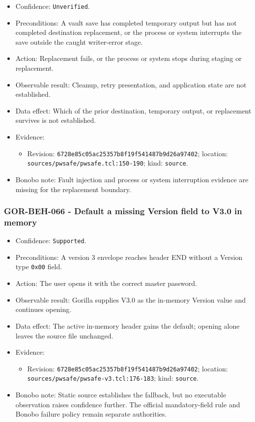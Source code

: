 \documentclass[
  letterpaper,
]{article}
\newcommand{\passthrough}[1]{#1}
\providecommand{\tightlist}{%
  \setlength{\itemsep}{0pt}\setlength{\parskip}{0pt}}
\begin{document}
\begin{itemize}
\tightlist
\item
  Confidence: \nolinkurl{Unverified}.
\item
  Preconditions: A vault save has completed temporary output but has not completed destination replacement, or the
  process or system interrupts the save outside the caught writer-error stage.
\item
  Action: Replacement fails, or the process or system stops during staging or replacement.
\item
  Observable result: Cleanup, retry presentation, and application state are not established.
\item
  Data effect: Which of the prior destination, temporary output, or replacement survives is not established.
\item
  Evidence:

  \begin{itemize}
  \tightlist
  \item
    Revision: \nolinkurl{6728e85c05ac25357b8f19f541487b9d26a97402}; location:
    \nolinkurl{sources/pwsafe/pwsafe.tcl:150-190}; kind: \passthrough{\lstinline!source!}.
  \end{itemize}
\item
  Bonobo note: Fault injection and process or system interruption evidence are missing for the replacement boundary.
\end{itemize}

\subsubsection{GOR-BEH-066 - Default a missing Version field to V3.0 in
memory}\label{gor-beh-066---default-a-missing-version-field-to-v30-in-memory}

\begin{itemize}
\tightlist
\item
  Confidence: \passthrough{\lstinline!Supported!}.
\item
  Preconditions: A version 3 envelope reaches header END without a Version type \passthrough{\lstinline!0x00!} field.
\item
  Action: The user opens it with the correct master password.
\item
  Observable result: Gorilla supplies V3.0 as the in-memory Version value and continues opening.
\item
  Data effect: The active in-memory header gains the default; opening alone leaves the source file unchanged.
\item
  Evidence:

  \begin{itemize}
  \tightlist
  \item
    Revision: \nolinkurl{6728e85c05ac25357b8f19f541487b9d26a97402}; location:
    \nolinkurl{sources/pwsafe/pwsafe-v3.tcl:176-183}; kind: \passthrough{\lstinline!source!}.
  \end{itemize}
\item
  Bonobo note: Static source establishes the fallback, but no executable observation raises confidence further. The
  official mandatory-field rule and Bonobo failure policy remain separate authorities.
\end{itemize}
\end{document}
